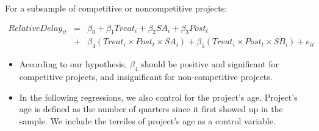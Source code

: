 \documentclass[]{article}
\begin{document}
For a subsample of competitive or noncompetitive projects:

\[ \begin{aligned} RelativeDelay_{it} &=& \beta_0 +\beta_1 Treat_i+ \beta_2 SA_i+ \beta_3 Post_t \\&+& \beta_4 (Treat_i \times Post_t \times SA_i )+\beta_5 (Treat_i \times Post_t \times SB_i )+e_{it} \end{aligned} \]

\begin{itemize}
\item
  According to our hypothesis, \(\beta_4\) should be positive and
  significant for competitive projects, and insignificant for
  non-competitive projects.
\item
  In the following regressions, we also control for the project's age.
  Project's age is defined as the number of quarters since it first
  showed up in the sample. We include the terciles of project's age as a
  control variable.
\end{itemize}
\end{document}
